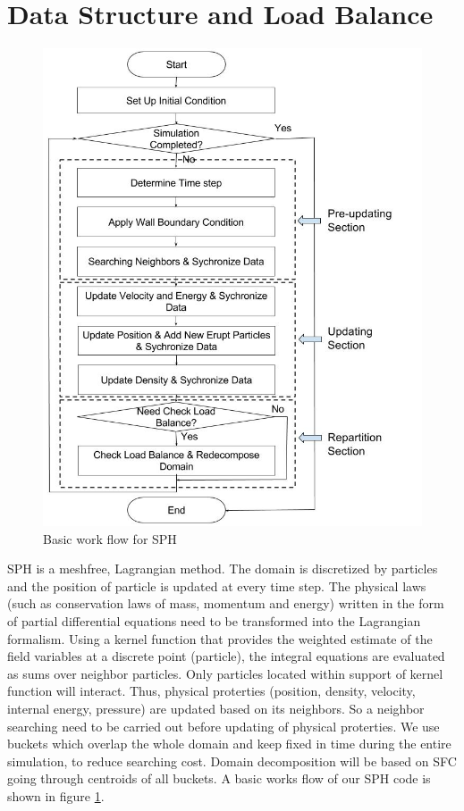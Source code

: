 \documentclass[conference,compsoc]{IEEEtran}
\begin{document}
\section{Data Structure and Load Balance}
\begin{figure}[!t]
\centering
\includegraphics[scale=0.34]{Work_flow}
\caption{Basic work flow for SPH}
\label{fig:Work_flow}
\end{figure}
SPH is a meshfree, Lagrangian method. The domain is discretized by particles and the position of particle is updated at every time step. The physical laws (such as conservation laws of mass, momentum and energy) written in the form of partial differential equations need to be transformed into the Lagrangian formalism. Using a kernel function that provides the weighted estimate of the field variables at a discrete point (particle), the integral equations are evaluated as sums over neighbor particles. Only particles located within support of kernel function will interact. Thus, physical proterties (position, density, velocity, internal energy, pressure) are updated based on its neighbors. So a neighbor searching need to be carried out before updating of physical proterties. We use buckets which overlap the whole domain and keep fixed in time during the entire simulation, to reduce searching cost. Domain decomposition will be based on SFC going through centroids of all buckets. A basic works flow of our SPH code is shown in figure \ref{fig:Work_flow}.\\
\end{document}
